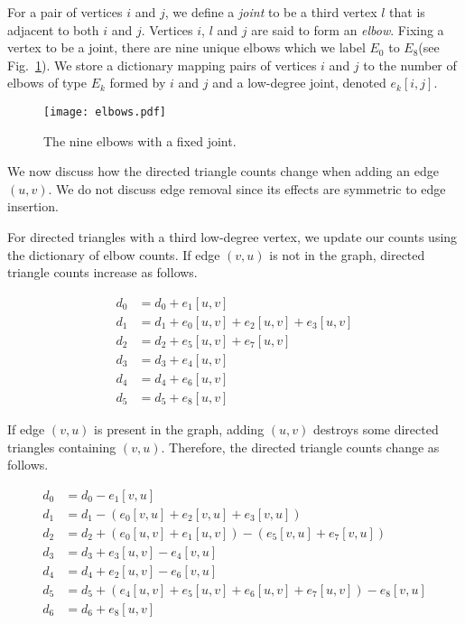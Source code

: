 \documentclass[11pt]{article}
\begin{document}
For a pair of vertices $i$ and $j$, we define a \emph{joint} to 
be a third vertex $l$ that is adjacent to both $i$ and $j$. Vertices $i$, 
$l$ and $j$ are said to form an \emph{elbow}. Fixing a vertex to be a joint, 
there are nine unique elbows which we label $E_0$ to 
$E_8$(see Fig.~\ref{fig-elbows}). We store a dictionary mapping pairs of 
vertices $i$ and $j$ to the number of elbows of type $E_k$ formed by $i$ and $j$ and a 
low-degree joint, denoted $e_k[i,j]$. 

\begin{figure}[t!]
\vspace{-24pt}
\begin{center}
\texttt{[image: elbows.pdf]}
\end{center}
\vspace{-24pt}
\caption{The nine elbows with a fixed joint.}
\label{fig-elbows}
\vspace{-12pt}
\end{figure}

We now discuss how the directed triangle counts change when adding an edge
$(u,v)$. We do not discuss edge removal since its effects are symmetric 
to edge insertion.

For directed triangles with a third low-degree vertex, we update our counts 
using the dictionary of elbow counts. If edge $(v,u)$ is 
not in the graph, directed triangle counts increase as follows.

\vspace*{-8pt}
{\small
\begin{align*}
d_0 &= d_0 + e_1[u,v]\\
d_1 &= d_1 + e_0[u,v] + e_2[u,v] + e_3[u,v]\\
d_2 &= d_2 + e_5[u,v] + e_7[u,v]\\
d_3 &= d_3 + e_4[u,v]\\
d_4 &= d_4 + e_6[u,v]\\
d_5 &= d_5 + e_8[u,v]
\end{align*}
}

\vspace*{-16pt}
If edge $(v,u)$ is present in the graph, adding $(u,v)$ destroys
some directed triangles containing $(v,u)$. Therefore, the directed 
triangle counts change as follows.

\vspace*{-8pt}
{\small
\begin{align*}
d_0 &= d_0 - e_1[v,u]\\
d_1 &= d_1 - (e_0[v,u] + e_2[v,u] + e_3[v,u])\\
d_2 &= d_2 + (e_0[u,v] + e_1[u,v]) - (e_5[v,u] + e_7[v,u])\\
d_3 &= d_3 + e_3[u,v] - e_4[v,u]\\
d_4 &= d_4 + e_2[u,v] - e_6[v,u]\\
d_5 &= d_5 + (e_4[u,v] + e_5[u,v] + e_6[u,v] + e_7[u,v]) - e_8[v,u]\\
d_6 &= d_6 + e_8[u,v]
\end{align*}
}
\vspace*{-16pt}
\end{document}
